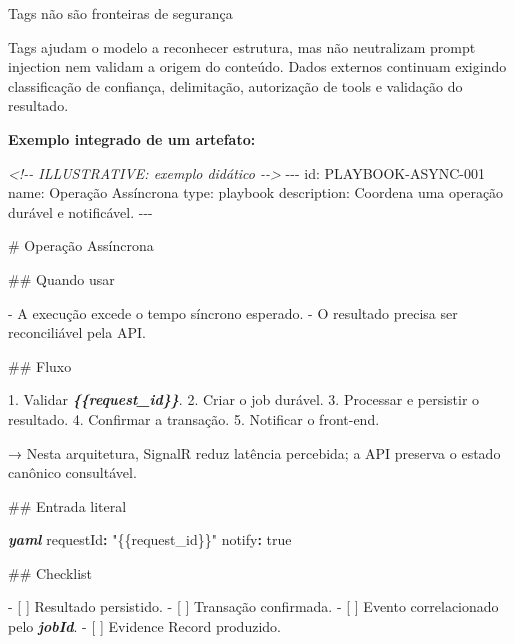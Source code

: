 \documentclass[
  10pt,
  a4paper,
  oneside]{book}
\newenvironment{Shaded}{}{}
\newcommand{\AttributeTok}[1]{\textcolor[rgb]{0.49,0.56,0.16}{#1}}
\newcommand{\CharTok}[1]{\textcolor[rgb]{0.25,0.44,0.63}{#1}}
\newcommand{\CommentTok}[1]{\textcolor[rgb]{0.38,0.63,0.69}{\textit{#1}}}
\newcommand{\FunctionTok}[1]{\textcolor[rgb]{0.02,0.16,0.49}{#1}}
\newcommand{\InformationTok}[1]{\textcolor[rgb]{0.38,0.63,0.69}{\textbf{\textit{#1}}}}
\newcommand{\KeywordTok}[1]{\textcolor[rgb]{0.00,0.44,0.13}{\textbf{#1}}}
\newcommand{\NormalTok}[1]{#1}
\newcommand{\SpecialStringTok}[1]{\textcolor[rgb]{0.73,0.40,0.53}{#1}}
\newcommand{\StringTok}[1]{\textcolor[rgb]{0.25,0.44,0.63}{#1}}
\newcommand{\VariableTok}[1]{\textcolor[rgb]{0.10,0.09,0.49}{#1}}
\begin{document}
\begin{warningbox}{Tags não são fronteiras de segurança}

Tags ajudam o modelo a reconhecer estrutura, mas não neutralizam prompt
injection nem validam a origem do conteúdo. Dados externos continuam
exigindo classificação de confiança, delimitação, autorização de tools e
validação do resultado.

\end{warningbox}

\textbf{Exemplo integrado de um artefato:}

\begin{Shaded}
\begin{Highlighting}[]
\CommentTok{\textless{}!{-}{-} ILLUSTRATIVE: exemplo didático {-}{-}\textgreater{}}
\NormalTok{{-}{-}{-}}
\NormalTok{id: PLAYBOOK{-}ASYNC{-}001}
\NormalTok{name: Operação Assíncrona}
\NormalTok{type: playbook}
\NormalTok{description: Coordena uma operação durável e notificável.}
\NormalTok{{-}{-}{-}}

\FunctionTok{\# Operação Assíncrona}

\FunctionTok{\#\# Quando usar}

\SpecialStringTok{{-} }\NormalTok{A execução excede o tempo síncrono esperado.}
\SpecialStringTok{{-} }\NormalTok{O resultado precisa ser reconciliável pela API.}

\FunctionTok{\#\# Fluxo}

\SpecialStringTok{1. }\NormalTok{Validar }\InformationTok{\textasciigrave{}\{\{request\_id\}\}\textasciigrave{}}\NormalTok{.}
\SpecialStringTok{2. }\NormalTok{Criar o job durável.}
\SpecialStringTok{3. }\NormalTok{Processar e persistir o resultado.}
\SpecialStringTok{4. }\NormalTok{Confirmar a transação.}
\SpecialStringTok{5. }\NormalTok{Notificar o front{-}end.}

\NormalTok{→ Nesta arquitetura, SignalR reduz latência percebida; a API preserva o estado canônico consultável.}

\FunctionTok{\#\# Entrada literal}

\InformationTok{\textasciigrave{}\textasciigrave{}\textasciigrave{}yaml}
\FunctionTok{requestId}\KeywordTok{:}\AttributeTok{ }\StringTok{"\{\{request\_id\}\}"}
\FunctionTok{notify}\KeywordTok{:}\AttributeTok{ }\CharTok{true}
\InformationTok{\textasciigrave{}\textasciigrave{}\textasciigrave{}}

\FunctionTok{\#\# Checklist}

\SpecialStringTok{{-} }\VariableTok{[ ]}\NormalTok{ Resultado persistido.}
\SpecialStringTok{{-} }\VariableTok{[ ]}\NormalTok{ Transação confirmada.}
\SpecialStringTok{{-} }\VariableTok{[ ]}\NormalTok{ Evento correlacionado pelo }\InformationTok{\textasciigrave{}jobId\textasciigrave{}}\NormalTok{.}
\SpecialStringTok{{-} }\VariableTok{[ ]}\NormalTok{ Evidence Record produzido.}
\end{Highlighting}
\end{Shaded}
\end{document}

